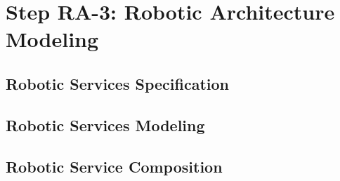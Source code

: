 \section{Step RA-3: Robotic Architecture Modeling}
\subsection{Robotic Services Specification}
\subsection{Robotic Services Modeling}
\subsection{Robotic Service Composition}
